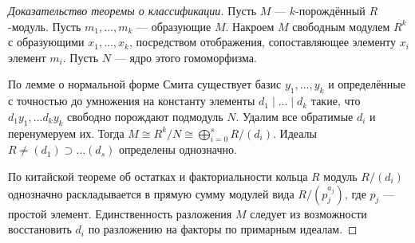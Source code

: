 \begin{proof}[Доказательство теоремы  о классификации]
	Пусть $ M $ --- $ k $-порождённый $ R $-модуль.
	Пусть $ m_1, \ldots, m_k $ --- образующие $ M $.
	Накроем $ M $ свободным модулем $ R^k $ с образующими $ x_1, \ldots, x_k $,
	посредством отображения, сопоставляющее элементу $ x_i $ элемент $ m_i $.
	Пусть $ N $ --- ядро этого гомоморфизма.
	
	По лемме о нормальной форме Смита существует базис $ y_1, \ldots, y_k $
	и определённые с точностью до умножения на константу элементы $ d_1 \mid \ldots \mid d_k $
	такие, что $ d_1y_1, \ldots d_ky_k $ свободно порождают подмодуль $ N $.
	Удалим все обратимые $ d_i $ и перенумеруем их.
	Тогда $ M \cong R^k/N \cong \bigoplus\limits_{i = 0}^{s} R/(d_i) $.
	Идеалы $ R \neq (d_1) \supset \ldots (d_s) $ определены однозначно.
	
	По китайской теореме об остатках и факториальности кольца $ R $ 
	модуль $ R/(d_i) $ однозначно раскладывается в прямую сумму модулей вида $ R/(p_j^{a_j}) $,
	где $ p_j $ --- простой элемент.
	Единственность разложения $ M $ 
	следует из возможности восстановить $ d_i $ по разложению на факторы по примарным идеалам.
	
\end{proof}
